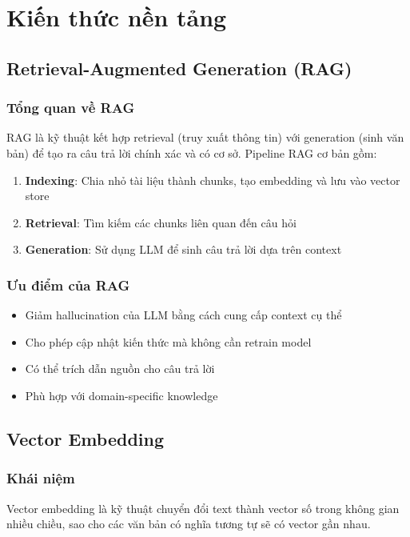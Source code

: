 \documentclass[../DoAn.tex]{subfiles}
\begin{document}
\section{Kiến thức nền tảng}

\subsection{Retrieval-Augmented Generation (RAG)}

\subsubsection{Tổng quan về RAG}
RAG là kỹ thuật kết hợp retrieval (truy xuất thông tin) với generation (sinh văn bản) để tạo ra câu trả lời chính xác và có cơ sở. Pipeline RAG cơ bản gồm:
\begin{enumerate}
    \item \textbf{Indexing}: Chia nhỏ tài liệu thành chunks, tạo embedding và lưu vào vector store
    \item \textbf{Retrieval}: Tìm kiếm các chunks liên quan đến câu hỏi
    \item \textbf{Generation}: Sử dụng LLM để sinh câu trả lời dựa trên context
\end{enumerate}

\subsubsection{Ưu điểm của RAG}
\begin{itemize}
    \item Giảm hallucination của LLM bằng cách cung cấp context cụ thể
    \item Cho phép cập nhật kiến thức mà không cần retrain model
    \item Có thể trích dẫn nguồn cho câu trả lời
    \item Phù hợp với domain-specific knowledge
\end{itemize}

\subsection{Vector Embedding}

\subsubsection{Khái niệm}
Vector embedding là kỹ thuật chuyển đổi text thành vector số trong không gian nhiều chiều, sao cho các văn bản có nghĩa tương tự sẽ có vector gần nhau.
\end{document}
